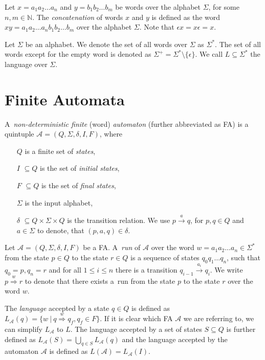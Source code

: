 Let $x = a_1a_2\ldots a_n$ and $y = b_1b_2\ldots b_m$ be words over the alphabet $\Sigma$, for some $n, m \in \mathbb{N}$. The \emph{concatenation} of words $x$ and $y$ is defined as the word $xy = a_1a_2\ldots a_nb_1b_2\ldots b_m$ over the alphabet $\Sigma$. Note that $\epsilon x = x \epsilon = x$. 

Let $\Sigma$ be an alphabet. We denote the set of all words over $\Sigma$ as $\Sigma^*$. The set of all words except for the empty word is denoted as $\Sigma^+ = \Sigma^* \setminus \{\epsilon\}$. We call $L \subseteq \Sigma^*$ the language over $\Sigma$.

 \section{Finite Automata}

 A~\emph{non-deterministic finite} (word) \emph{automaton} (further abbreviated as FA) is a quintuple $\mathcal{A} = (Q, \Sigma, \delta, I, F)$, where
  \begin{itemize}
	 \item[$Q$] is a finite set of \emph{states},
	 \item[$I$] $ \subseteq Q$ is the set of \emph{initial states},
	 \item[$F$] $ \subseteq Q$ is the set of \emph{final states},
	 \item[$\Sigma$] is the input alphabet,
	 \item[$\delta$] $ \subseteq Q \times\Sigma\times Q$ is the transition relation. We use $p \overset{a}{\longrightarrow} q$, for $p, q \in Q$ and $a \in \Sigma$ to denote, that $(p, a, q) \in \delta$.
	\end{itemize}
	
		Let $\mathcal{A} = (Q, \Sigma, \delta, I, F)$ be a FA. A~\emph{run} of
		$\mathcal{A}$ over the word $w = a_1a_2\ldots a_n \in \Sigma^*$ from the state
		$p \in Q$ to the state $r \in Q$ is a sequence of states $q_0q_1\ldots q_n$, such that $q_0 = p, q_n = r$ and for all $1 \leq i \leq n$ there is a transition $q_{i-1} \overset{a_i}{\longrightarrow} q_i$. We write $p \overset{w}{\Longrightarrow} r$ to denote that there exists a~run from the state $p$ to the state $r$ over the word $w$.
	
	The \emph{language} accepted by a state $q \in Q$ is defined as $L_{\mathcal{A}}(q) = \{w\ |\ q \overset{w}{\Longrightarrow} q_f, q_f \in F\}$. If it is clear which FA $\mathcal{A}$ we are referring to, we can simplify $L_{\mathcal{A}}$ to $L$. The language accepted by a set of states $S \subseteq Q$ is further defined as $L_{\mathcal{A}}(S) = \bigcup_{q \in S} L_{\mathcal{A}}(q)$ and the language accepted by the automaton $\mathcal{A}$ is defined as $L(\mathcal{A}) = L_{\mathcal{A}}(I)$.
	
